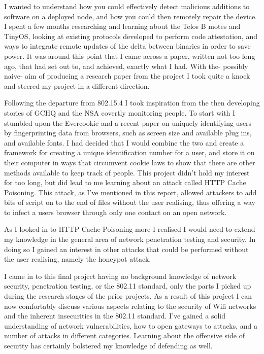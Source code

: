 I wanted to understand how you could effectively detect malicious additions to software on a deployed node, and how you could then remotely repair the device. I spent a few months researching and learning about the Telos B motes and TinyOS, looking at existing protocols developed to perform code attestation, and ways to integrate remote updates of the delta between binaries in order to save power. It was around this point that I came across a paper, written not too long ago, that had set out to, and achieved, exactly what I had. With the- possibly naive- aim of producing a research paper from the project I took quite a knock and steered my project in a different direction.

Following the departure from 802.15.4 I took inspiration from the then developing stories of GCHQ and the NSA covertly monitoring people. To start with I stumbled upon the Evercookie and a recent paper on uniquely identifying users by fingerprinting data from browsers, such as screen size and available plug ins, and available fonts. I had decided that I would combine the two and create a framework for creating a unique identification number for a user, and store it on their computer in ways that circumvent cookie laws to show that there are other methods available to keep track of people. This project didn't hold my interest for too long, but did lead to me learning about an attack called HTTP Cache Poisoning. This attack, as I've mentioned in this report, allowed attackers to add bits of script on to the end of files without the user realising, thus offering a way to infect a users browser through only one contact on an open network.

As I looked in to HTTP Cache Poisoning more I realised I would need to extend my knowledge in the general area of network penetration testing and security. In doing so I gained an interest in other attacks that could be performed without the user realising, namely the honeypot attack.

I came in to this final project having no background knowledge of network security, penetration testing, or the 802.11 standard, only the parts I picked up during the research stages of the prior projects. As a result of this project I can now comfortably discuss various aspects relating to the security of Wifi networks and the inherent insecurities in the 802.11 standard. I’ve gained a solid understanding of network vulnerabilities, how to open gateways to attacks, and a number of attacks in different categories. Learning about the offensive side of security has certainly bolstered my knowledge of defending as well.

